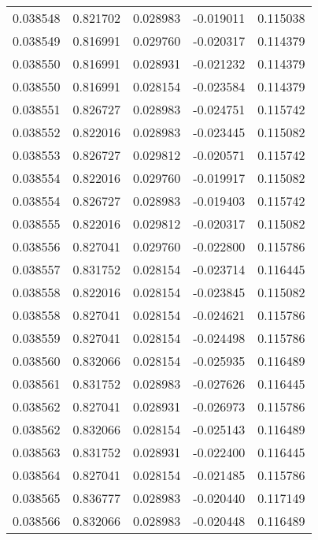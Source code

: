 \begin{tabular}{lrrrr}
0.038548    &  0.821702 &  0.028983 & -0.019011 &             0.115038 \\
0.038549    &  0.816991 &  0.029760 & -0.020317 &             0.114379 \\
0.038550    &  0.816991 &  0.028931 & -0.021232 &             0.114379 \\
0.038550    &  0.816991 &  0.028154 & -0.023584 &             0.114379 \\
0.038551    &  0.826727 &  0.028983 & -0.024751 &             0.115742 \\
0.038552    &  0.822016 &  0.028983 & -0.023445 &             0.115082 \\
0.038553    &  0.826727 &  0.029812 & -0.020571 &             0.115742 \\
0.038554    &  0.822016 &  0.029760 & -0.019917 &             0.115082 \\
0.038554    &  0.826727 &  0.028983 & -0.019403 &             0.115742 \\
0.038555    &  0.822016 &  0.029812 & -0.020317 &             0.115082 \\
0.038556    &  0.827041 &  0.029760 & -0.022800 &             0.115786 \\
0.038557    &  0.831752 &  0.028154 & -0.023714 &             0.116445 \\
0.038558    &  0.822016 &  0.028154 & -0.023845 &             0.115082 \\
0.038558    &  0.827041 &  0.028154 & -0.024621 &             0.115786 \\
0.038559    &  0.827041 &  0.028154 & -0.024498 &             0.115786 \\
0.038560    &  0.832066 &  0.028154 & -0.025935 &             0.116489 \\
0.038561    &  0.831752 &  0.028983 & -0.027626 &             0.116445 \\
0.038562    &  0.827041 &  0.028931 & -0.026973 &             0.115786 \\
0.038562    &  0.832066 &  0.028154 & -0.025143 &             0.116489 \\
0.038563    &  0.831752 &  0.028931 & -0.022400 &             0.116445 \\
0.038564    &  0.827041 &  0.028154 & -0.021485 &             0.115786 \\
0.038565    &  0.836777 &  0.028983 & -0.020440 &             0.117149 \\
0.038566    &  0.832066 &  0.028983 & -0.020448 &             0.116489 \\

\end{tabular}
